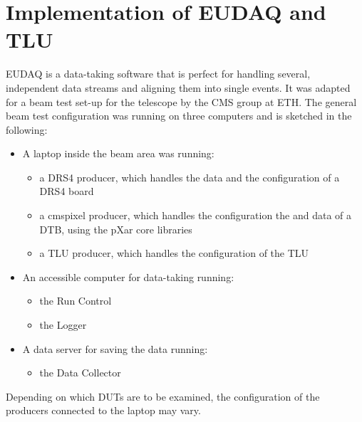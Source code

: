 \documentclass[british,11pt,a4paper]{memoir}
\begin{document}
\section{Implementation of EUDAQ and \ac{TLU}}
EUDAQ is a data-taking software that is perfect for handling several, independent data streams and aligning them into single events. It was adapted for a beam test set-up for the telescope by the CMS group at \ac{ETH}.
The general beam test configuration was running on three computers and is sketched in the following:
\begin{itemize}
	\item A laptop inside the beam area was running:
		\begin{itemize}
			\item a DRS4 producer, which handles the data and the configuration of a DRS4 board
			\item a cmspixel producer, which handles the configuration the and data of a \ac{DTB}, using the pXar core libraries
			\item a \ac{TLU} producer, which handles the configuration of the \ac{TLU} 
		\end{itemize}
	\item An accessible computer for data-taking running:
		\begin{itemize}
			\item the Run Control
			\item the Logger
		\end{itemize}
	\item A data server for saving the data running:
		\begin{itemize}
			\item the Data Collector
		\end{itemize}
\end{itemize}
Depending on which \ac{DUT}s are to be examined, the configuration of the producers connected to the laptop may vary.
\end{document}
